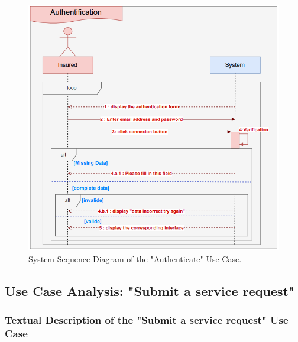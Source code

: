 \begin{figure}[h!]
    \centering
    \includegraphics[width=1\textwidth]{figures/seqAuthentification.png}
    \caption{System Sequence Diagram of the "Authenticate" Use Case.}
\end{figure}
\clearpage
\subsection{Use Case Analysis: "Submit a service request"}
\subsubsection{Textual Description of the "Submit a service request" Use Case}

